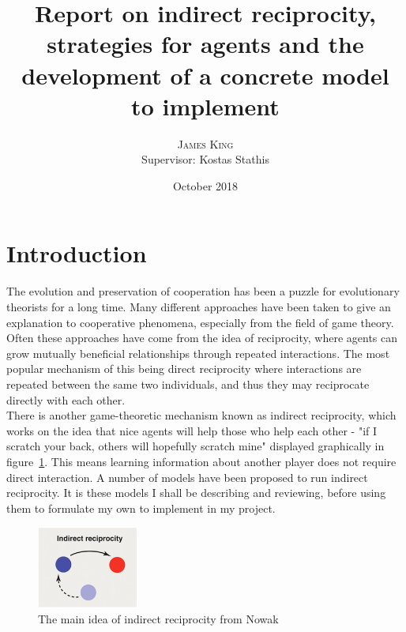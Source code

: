 \documentclass[twoside,twocolumn]{article}
\title{Report on indirect reciprocity, strategies for agents and the development of a concrete model to implement} %
\author{%
\textsc{James King} \\%
\normalsize Supervisor: Kostas Stathis \\ %
}
\date{October 2018} %
\begin{document}



\maketitle


\section{Introduction}
The evolution and preservation of cooperation has been a puzzle for evolutionary theorists for a long time. Many different approaches have been taken to give an explanation to cooperative phenomena, especially from the field of game theory. Often these approaches have come from the idea of reciprocity, where agents can grow mutually beneficial relationships through repeated interactions. The most popular mechanism of this being direct reciprocity where interactions are repeated between the same two individuals, and thus they may reciprocate directly with each other.\\
There is another game-theoretic mechanism known as indirect reciprocity, which works on the idea that nice agents will help those who help each other - "if I scratch your back, others will hopefully scratch mine" displayed graphically in figure~\ref{fig:indir_rec}. This means learning information about another player does not require direct interaction. A number of models have been proposed to run indirect reciprocity. It is these models I shall be describing and reviewing, before using them to formulate my own to implement in my project.
\begin{figure}
	\begin{center}
	\includegraphics[width=0.3\textwidth]{Indirect_rec.png}
	\caption{The main idea of indirect reciprocity from Nowak~\cite{five_rules_coop}}
	\label{fig:indir_rec}
	\end{center}
\end{figure}
\end{document}

